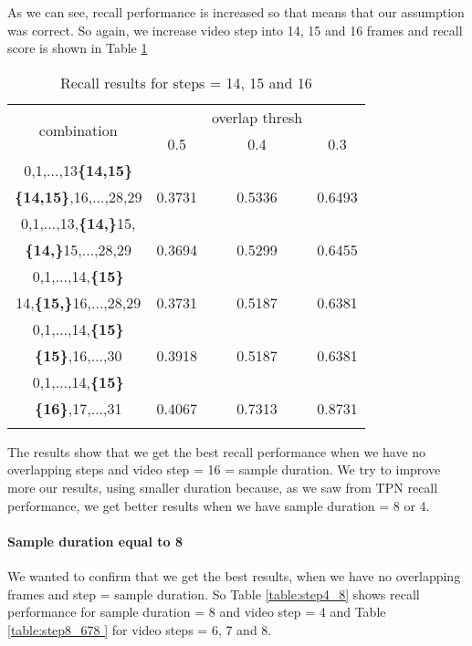As we can see, recall performance is increased so that means that our assumption was correct. So again, we increase video step into 14, 15 and 16 frames
and recall score is shown in Table \ref{table:step14_16}
\begin{center}
\begin{longtable}{||c||c c c||}

  \hline
  \multirow{2}{5em}{combination} & {} &overlap thresh & {} \\
                                    &  0.5  &  0.4 &  0.3 \\         
  \hline  \hline
  0,1,...,13\textbf{\{14,15\}}                & {} & {} & {} \\
  \textbf{\{14,15\}},16,...,28,29                & 0.3731 & 0.5336 & 0.6493 \\
  \hline     \hline                          

  0,1,...,13,\textbf{\{14,\}}15,              & {} & {} & {} \\
  \textbf{\{14,\}}15,...,28,29                & 0.3694   & 0.5299 & 0.6455 \\
  \hline                          
  0,1,...,14,\textbf{\{15\}}                  & {} & {} & {} \\
  14,\textbf{\{15,\}}16,...,28,29             & 0.3731   & 0.5187 & 0.6381 \\
  \hline  \hline

  0,1,...,14,\textbf{\{15\}}                & {} & {} & {} \\
  \textbf{\{15\}},16,...,30                 & 0.3918 & 0.5187 & 0.6381 \\
  \hline     \hline                          
  0,1,...,14,\textbf{\{15\}}                & {} & {} & {} \\
  \textbf{\{16\}},17,...,31                 & 0.4067 & 0.7313 & 0.8731 \\
  \hline                          
  \caption{Recall results for steps = 14, 15 and 16}
  \label{table:step14_16}
\end{longtable} 
\end{center}

The results show that we get the best recall performance when we have no overlapping steps and video step = 16 = sample duration. We try to improve
more our results, using smaller duration because, as we saw from TPN recall performance, we get better results when we have sample duration = 8 or 4.

\paragraph{Sample duration equal to  8}
We wanted to confirm that we get the best results, when we have no overlapping frames and step = sample duration. So Table \ref{table:step4_8}
shows recall performance for sample duration = 8 and video step = 4 and Table \ref{table:step8_678 } for video steps = 6, 7 and 8.


